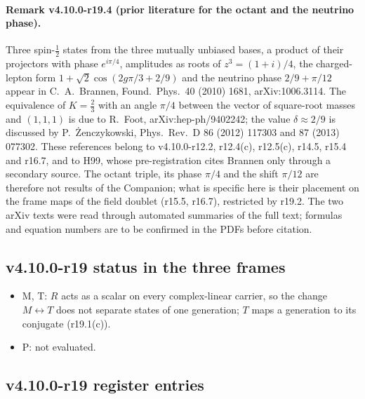 \paragraph{Remark v4.10.0-r19.4 (prior literature for the octant and the neutrino phase).}
Three spin-\(\tfrac12\) states from the three mutually unbiased bases, a product of their projectors with phase \(e^{i\pi/4}\), amplitudes
as roots of \(z^3=(1+i)/4\), the charged-lepton form \(1+\sqrt2\cos(2g\pi/3+2/9)\) and the neutrino phase \(2/9+\pi/12\) appear in
C.~A.~Brannen, Found.\ Phys.\ 40 (2010) 1681, arXiv:1006.3114.  The equivalence of \(K=\tfrac23\) with an angle \(\pi/4\) between the
vector of square-root masses and \((1,1,1)\) is due to R.~Foot, arXiv:hep-ph/9402242; the value \(\delta\approx2/9\) is discussed by
P.~\.Zenczykowski, Phys.\ Rev.\ D 86 (2012) 117303 and 87 (2013) 077302.  These references belong to v4.10.0-r12.2, r12.4(c),
r12.5(c), r14.5, r15.4 and r16.7, and to H99, whose pre-registration cites Brannen only through a secondary source.  The
octant triple, its phase \(\pi/4\) and the shift \(\pi/12\) are therefore not results of the Companion; what is specific here is their
placement on the frame maps of the field doublet (r15.5, r16.7), restricted by r19.2.  The two arXiv texts were read through
automated summaries of the full text; formulas and equation numbers are to be confirmed in the PDFs before citation.

\subsection*{v4.10.0-r19 status in the three frames}
\label{subsec:v4100-r19-frames}

\begin{itemize}[leftmargin=2em]
\item M, T: \(R\) acts as a scalar on every complex-linear carrier, so the change \(M\leftrightarrow T\) does not separate states of one
generation; \(T\) maps a generation to its conjugate (r19.1(c)).
\item P: not evaluated.
\end{itemize}

\subsection*{v4.10.0-r19 register entries}
\label{subsec:v4100-r19-register}

